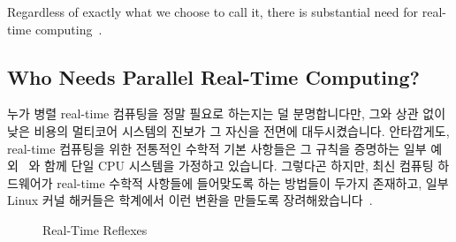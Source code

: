 Regardless of exactly what we choose to call it, there is substantial
need for real-time
computing~\cite{JeremyWPeters2006NYTDec11,BillInmon2007a}.
\fi

\subsection{Who Needs Parallel Real-Time Computing?}
\label{sec:advsync:Who Needs Parallel Real-Time Computing?}
누가 병렬 real-time 컴퓨팅을 정말 필요로 하는지는 덜 분명합니다만, 그와 상관
없이 낮은 비용의 멀티코어 시스템의 진보가 그 자신을 전면에 대두시켰습니다.
안타깝게도, real-time 컴퓨팅을 위한 전통적인 수학적 기본 사항들은 그 규칙을
증명하는 일부 예외~\cite{BjoernBrandenburgPhD} 와 함께 단일 CPU 시스템을
가정하고 있습니다.
그렇다곤 하지만, 최신 컴퓨팅 하드웨어가 real-time 수학적 사항들에 들어맞도록
하는 방법들이 두가지 존재하고, 일부 Linux 커널 해커들은 학계에서 이런 변환을
만들도록 장려해왔습니다~\cite{ThomasGleixner2010AcademiaVsReality}.

\begin{figure}[tb]
\centering
{}
\caption{Real-Time Reflexes}
\label{fig:advsync:Real-Time Reflexes}
\end{figure}


